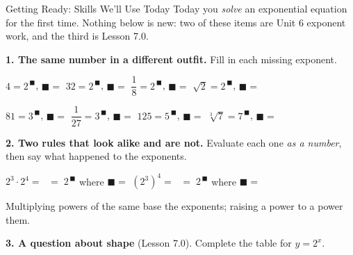 \documentclass[10pt]{article}
\begin{document}
\namedateperiod

\vspace{0.10in}

\begin{notesbox}{Getting Ready: Skills We'll Use Today}
\small Today you \emph{solve} an exponential equation for the first time. Nothing below is new: two of
these items are Unit 6 exponent work, and the third is Lesson 7.0.

\vspace{5pt}
\textbf{1. The same number in a different outfit.} Fill in each missing exponent.

\vspace{4pt}
\hspace*{1.2em} $4 = 2^{\,\blacksquare}$, \; $\blacksquare=$  \qquad
$32 = 2^{\,\blacksquare}$, \; $\blacksquare=$  \qquad
$\dfrac{1}{8} = 2^{\,\blacksquare}$, \; $\blacksquare=$  \qquad
$\sqrt{2} = 2^{\,\blacksquare}$, \; $\blacksquare=$ 

\vspace{5pt}
\hspace*{1.2em} $81 = 3^{\,\blacksquare}$, \; $\blacksquare=$  \qquad
$\dfrac{1}{27} = 3^{\,\blacksquare}$, \; $\blacksquare=$  \qquad
$125 = 5^{\,\blacksquare}$, \; $\blacksquare=$  \qquad
$\sqrt[3]{7} = 7^{\,\blacksquare}$, \; $\blacksquare=$ 

\vspace{0.32in}

\textbf{2. Two rules that look alike and are not.} Evaluate each one \emph{as a number}, then say what
happened to the exponents.

\vspace{4pt}
\hspace*{1.2em} $2^{3}\cdot 2^{4} =$  $\;=\; 2^{\,\blacksquare}$ where $\blacksquare=$
 \qquad
$\left(2^{3}\right)^{4} =$  $\;=\; 2^{\,\blacksquare}$ where $\blacksquare=$

\vspace{4pt}
\hspace*{1.2em} Multiplying powers of the same base  the exponents; raising a power to a
power  them.

\vspace{0.38in}

\textbf{3. A question about shape} (Lesson 7.0). Complete the table for $y=2^{x}$.


\end{notesbox}
\end{document}
